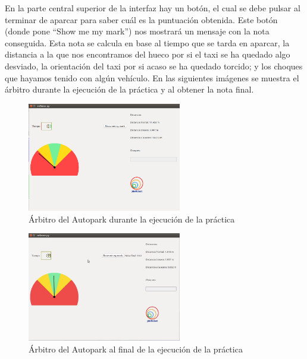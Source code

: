 En la parte central superior de la interfaz hay un botón, el cual se debe pulsar al terminar de aparcar para saber cuál es la puntuación obtenida. Este botón (donde pone “Show me my mark”) nos mostrará un mensaje con la nota conseguida. Esta nota se calcula en base al tiempo que se tarda en aparcar, la distancia a la que nos encontramos del hueco por si el taxi se ha quedado algo desviado, la orientación del taxi por si acaso se ha quedado torcido; y los choques que hayamos tenido con algún vehículo. En las siguientes imágenes se muestra el árbitro durante la ejecución de la práctica y al obtener la nota final.\\

\begin{figure}[H]
  \begin{center}
    \includegraphics[width=0.6\textwidth]{figures/Autopark/Referee_DurantePractica.png}
		\caption{Árbitro del Autopark durante la ejecución de la práctica}
		\label{fig.Referee_DurantePractica}
		\end{center}
\end{figure}

\begin{figure}[H]
  \begin{center}
    \includegraphics[width=0.6\textwidth]{figures/Autopark/Referee_Final_Autopark.png}
		\caption{Árbitro del Autopark al final de la ejecución de la práctica}
		\label{fig.Referee_Final_Autopark}
		\end{center}
\end{figure}

